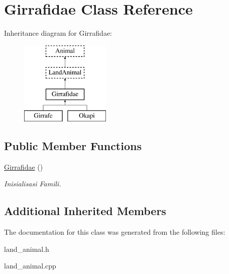 \hypertarget{class_girrafidae}{}\section{Girrafidae Class Reference}
\label{class_girrafidae}
Inheritance diagram for Girrafidae\+:\begin{figure}[H]
\begin{center}
\leavevmode
\includegraphics[height=4.000000cm]{class_girrafidae}
\end{center}
\end{figure}
\subsection*{Public Member Functions}
\begin{DoxyCompactItemize}
\item 
\hyperlink{class_girrafidae_a8e08e8d26a54d9ca3d9216685ce28ba8}{Girrafidae} ()\hypertarget{class_girrafidae_a8e08e8d26a54d9ca3d9216685ce28ba8}{}\label{class_girrafidae_a8e08e8d26a54d9ca3d9216685ce28ba8}

\begin{DoxyCompactList}\small\item\em Inisialisasi Famili. \end{DoxyCompactList}\end{DoxyCompactItemize}
\subsection*{Additional Inherited Members}


The documentation for this class was generated from the following files\+:\begin{DoxyCompactItemize}
\item 
land\+\_\+animal.\+h\item 
land\+\_\+animal.\+cpp\end{DoxyCompactItemize}

